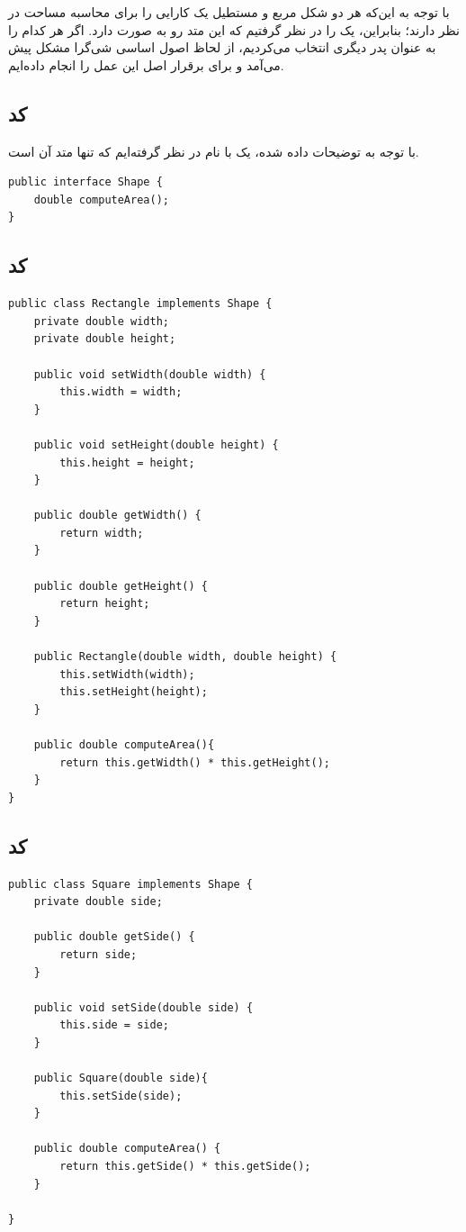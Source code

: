 \newpage
{}

با توجه به این‌که هر دو شکل مربع و مستطیل یک کارایی را برای محاسبه مساحت در نظر دارند؛ بنابراین، یک  را در نظر گرفتیم که این متد رو به صورت  دارد. اگر هر کدام را به عنوان پدر دیگری انتخاب می‌کردیم، از لحاظ اصول‌ اساسی شی‌گرا مشکل پیش می‌آمد و برای برقرار اصل  این عمل را انجام داده‌ایم.

\subsection*{کد }
با توجه به توضیحات داده شده، یک  با نام  در نظر گرفته‌ایم که تنها متد آن  است.

\begin{Verbatim}[tabsize=4]
public interface Shape {
	double computeArea();
}
\end{Verbatim}



\subsection*{کد }

\begin{Verbatim}[tabsize=4]
public class Rectangle implements Shape {
	private double width;
	private double height;
	
	public void setWidth(double width) {
		this.width = width;
	}
	
	public void setHeight(double height) {
		this.height = height;
	}
	
	public double getWidth() {
		return width;
	}
	
	public double getHeight() {
		return height;
	}
	
	public Rectangle(double width, double height) {
		this.setWidth(width);
		this.setHeight(height);
	}
	
	public double computeArea(){
		return this.getWidth() * this.getHeight();
	}
}
\end{Verbatim}

\subsection*{کد }

\begin{Verbatim}[tabsize=4]
public class Square implements Shape {
	private double side;
	
	public double getSide() {
		return side;
	}
	
	public void setSide(double side) {
		this.side = side;
	}
	
	public Square(double side){
		this.setSide(side);
	}
	
	public double computeArea() {
		return this.getSide() * this.getSide();
	}

}
\end{Verbatim}

